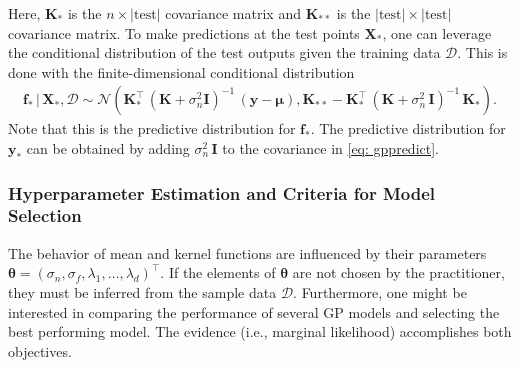 \documentclass[journal=jacsat,manuscript=article, ]{achemso}
\newcommand{\xmatrix}{\ensuremath{\mathbf{X}}}
\begin{document}
 Here, $\mathbf{K}_*$ is the $n \times |\text{test}|$ covariance matrix and $\mathbf{K}_{**}$ is the $|\text{test}| \times |\text{test}|$ covariance matrix. 
 To make predictions at the test points $\xmatrix_{*}$, one can leverage the conditional distribution of the test outputs given the training data $\mathcal{D}$. This is done with the finite-dimensional conditional distribution
 \begin{gather}
     \mathbf{f}_* \,|\, \xmatrix_*, \mathcal{D} \sim \mathcal{N}(\mathbf{K}_{*}^\intercal \,(\mathbf{K} +\sigma_n^2 \mathbf{I})^{-1}\,(\mathbf{y}-\boldsymbol{\mu}),  \mathbf{K}_{**} - \mathbf{K}_{*}^\intercal \,(\mathbf{K}+\sigma_n^2\,\mathbf{I})^{-1}\,\mathbf{K}_{*}).   \label{eq: gppredict}
 \end{gather}
 Note that this is the predictive distribution for $\mathbf{f}_*$. The predictive distribution for $\mathbf{y}_*$ can be obtained by adding $\sigma_n^2\, \mathbf{I}$ to the covariance in \eqref{eq: gppredict}.

 \subsubsection{Hyperparameter Estimation and Criteria for Model Selection}
 The behavior of mean and kernel functions are influenced by their parameters $\boldsymbol{\theta} = (\sigma_n, \sigma_f, \lambda_1,\dots,\lambda_d)^\intercal$. If the elements of $\boldsymbol{\theta}$ are not chosen by the practitioner, they must be inferred from the sample data $\mathcal{D}$. Furthermore, one might be interested in comparing the performance of several GP models and selecting the best performing model. The evidence (i.e., marginal likelihood) accomplishes both objectives.
\end{document}
